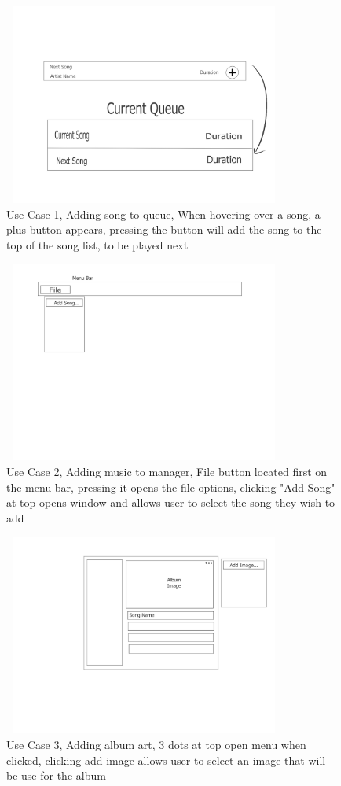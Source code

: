 \documentclass[10pt,conference,onecolumn,compsoc]{IEEEtran}
\begin{document}
\begin{figure}[ht!]
\includegraphics[height=250px, width=350px]{Add_Song_Queue_Mock_Up.jpg}
\caption{Use Case 1, Adding song to queue, When hovering over a song, a plus button appears, pressing the button will add the song to the top of the song list, to be played next}
\label{AddSong}
\end{figure}

\begin{figure}[ht!]
\includegraphics[height=250px, width=350px]{Add_Music_Mock_Up.jpg}
\caption{Use Case 2, Adding music to manager, File button located first on the menu bar, pressing it opens the file options, clicking "Add Song" at top opens window and allows user to select the song they wish to add}
\label{AddMusic}
\end{figure}

\begin{figure}
\includegraphics[height=250px, width=350px]{Add_Image_Mock_Up.jpg}
\caption{Use Case 3, Adding album art, 3 dots at top open menu when clicked, clicking add image allows user to select an image that will be use for the album}
\label{AddAlbumArt}
\end{figure}
\end{document}
